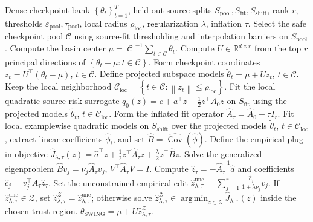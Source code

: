 \documentclass{article}
\newcommand{\RR}{\mathbb{R}}
\newcommand{\cC}{\mathcal{C}}
\newcommand{\cZ}{\mathcal{Z}}
\newcommand{\argmin}{\operatorname*{arg\,min}}
\newcommand{\Cov}{\operatorname{Cov}}
\newcommand{\swing}{\textup{\textsc{SWING}}}
\newcommand{\norm}[1]{\left\lVert #1 \right\rVert}
\newcommand{\braces}[1]{\left\{ #1 \right\}}
\begin{document}
\begin{algorithm}[t]
\caption{\swing{}}
\label{alg:swing}
\begin{algorithmic}[1]
\Require Dense checkpoint bank \(\braces{\theta_t}_{t=1}^T\), held-out source splits \(S_{\mathrm{pool}},S_{\mathrm{fit}},S_{\mathrm{shift}}\), rank \(r\), thresholds \(\varepsilon_{\mathrm{pool}},\tau_{\mathrm{pool}}\), local radius \(\rho_{\mathrm{loc}}\), regularization \(\lambda\), inflation \(\tau\).
\State Select the safe checkpoint pool \(\cC\) using source-fit thresholding and interpolation barriers on \(S_{\mathrm{pool}}\).
\State Compute the basin center \(\mu = |\cC|^{-1}\sum_{t\in\cC}\theta_t\).
\State Compute \(U\in\RR^{d\times r}\) from the top \(r\) principal directions of \(\braces{\theta_t-\mu : t\in\cC}\).
\State Form checkpoint coordinates \(z_t = U^\top(\theta_t-\mu)\), \(t\in\cC\).
\State Define projected subspace models \(\tilde\theta_t = \mu + U z_t\), \(t\in\cC\).
\State Keep the local neighborhood \(\cC_{\mathrm{loc}}=\braces{t\in\cC : \norm{z_t}\le \rho_{\mathrm{loc}}}\).
\State Fit the local quadratic source-risk surrogate \(q_0(z)=c+a^\top z+\tfrac12 z^\top A_0 z\) on \(S_{\mathrm{fit}}\) using the projected models \(\tilde\theta_t\), \(t\in\cC_{\mathrm{loc}}\).
\State Form the inflated fit operator \(\hat A_\tau = \hat A_0 + \tau I_r\).
\State Fit local examplewise quadratic models on \(S_{\mathrm{shift}}\) over the projected models \(\tilde\theta_t\), \(t\in\cC_{\mathrm{loc}}\), extract linear coefficients \(\hat\phi_i\), and set \(\hat B = \widehat{\Cov}(\hat\phi)\).
\State Define the empirical plug-in objective \(\hat J_{\lambda,\tau}(z)=\hat a^\top z+\tfrac12 z^\top \hat A_\tau z+\tfrac{\lambda}{2} z^\top \hat B z\).
\State Solve the generalized eigenproblem \(\hat B v_j = \nu_j \hat A_\tau v_j\), \(V^\top \hat A_\tau V = I\).
\State Compute \(\hat z_\tau = -\hat A_\tau^{-1}\hat a\) and coefficients \(\hat c_j = v_j^\top \hat A_\tau \hat z_\tau\).
\State Set the unconstrained empirical edit \(\hat z_{\lambda,\tau}^{\mathrm{unc}} = \sum_{j=1}^r \frac{\hat c_j}{1+\lambda \nu_j}v_j\).
\State If \(\hat z_{\lambda,\tau}^{\mathrm{unc}}\in\cZ\), set \(\hat z_{\lambda,\tau}^{\cZ}=\hat z_{\lambda,\tau}^{\mathrm{unc}}\); otherwise solve \(\hat z_{\lambda,\tau}^{\cZ}\in\argmin_{z\in\cZ} \hat J_{\lambda,\tau}(z)\) inside the chosen trust region.
\State \Return \(\theta_{\mathrm{SWING}} = \mu + U \hat z_{\lambda,\tau}^{\cZ}\).
\end{algorithmic}
\end{algorithm}
\end{document}
